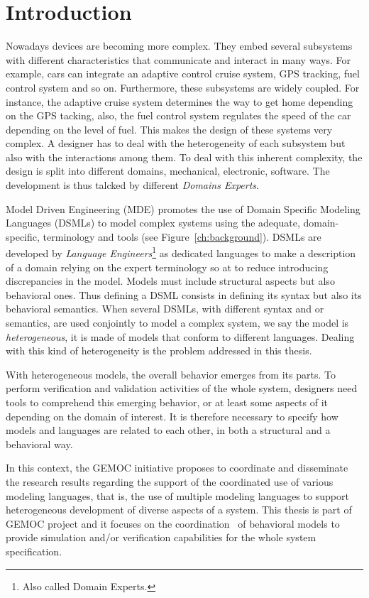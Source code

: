 \chapter{Introduction}	
Nowadays devices are becoming more complex. They embed several subsystems with different characteristics that communicate and interact in many ways. For example, cars can integrate an adaptive control cruise system, GPS tracking, fuel control system and so on. Furthermore, these subsystems are widely coupled. For instance, the adaptive cruise system determines the way to get home depending on the GPS tacking, also, the fuel control system regulates the speed of the car depending on the level of fuel. This makes the design of these systems very complex. A designer has to deal with the heterogeneity of each subsystem but also with the interactions among them. To deal with this inherent complexity, the design is split into different domains, \eg mechanical, electronic, software. The development is thus talcked by different \emph{Domains Experts}.

Model Driven Engineering (MDE) promotes the use of Domain Specific Modeling Languages (DSMLs) to model complex systems using the adequate, domain-specific, terminology and tools (see Figure~\ref{ch:background}). DSMLs are developed by \emph{Language Engineers}\footnote{Also called Domain Experts.} as dedicated languages to make a description of a domain relying on the expert terminology so at to reduce introducing discrepancies in the model. Models must include structural aspects but also behavioral ones. Thus defining a DSML consists in defining its syntax but also its behavioral semantics. When several DSMLs, with different syntax and or semantics, are used conjointly to model a complex system, we say the model is \emph{heterogeneous}, \ie it is made of models that conform to different languages. Dealing with this kind of heterogeneity is the problem addressed in this thesis. 

With heterogeneous models, the overall behavior emerges from its parts. To perform verification and validation activities of the whole system, designers need tools to comprehend this emerging behavior, 
or at least some aspects of it depending on the domain of interest. It is therefore necessary to specify how models and languages are related to each other, in both a structural and a behavioral way.

In this context, the GEMOC initiative proposes to coordinate and disseminate the research results regarding the support of the coordinated use of various modeling languages, that is, the use of multiple modeling languages to support heterogeneous development of diverse aspects of a system. This thesis is part of GEMOC project and it focuses on the coordination~\cite{coordsignibib} of behavioral models to provide simulation and/or verification capabilities for the whole system specification. 


